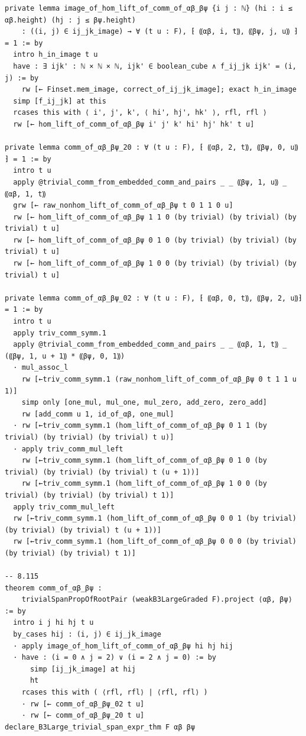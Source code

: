 \begin{Verbatim}
private lemma image_of_hom_lift_of_comm_of_αβ_βψ {i j : ℕ} (hi : i ≤ αβ.height) (hj : j ≤ βψ.height)
    : ((i, j) ∈ ij_jk_image) → ∀ (t u : F), ⁅ ⸨αβ, i, t⸩, ⸨βψ, j, u⸩ ⁆ = 1 := by
  intro h_in_image t u
  have : ∃ ijk' : ℕ × ℕ × ℕ, ijk' ∈ boolean_cube ∧ f_ij_jk ijk' = (i, j) := by
    rw [← Finset.mem_image, correct_of_ij_jk_image]; exact h_in_image
  simp [f_ij_jk] at this
  rcases this with ⟨ i', j', k', ⟨ hi', hj', hk' ⟩, rfl, rfl ⟩
  rw [← hom_lift_of_comm_of_αβ_βψ i' j' k' hi' hj' hk' t u]

private lemma comm_of_αβ_βψ_20 : ∀ (t u : F), ⁅ ⸨αβ, 2, t⸩, ⸨βψ, 0, u⸩ ⁆ = 1 := by
  intro t u
  apply @trivial_comm_from_embedded_comm_and_pairs _ _ ⸨βψ, 1, u⸩ _ ⸨αβ, 1, t⸩
  grw [← raw_nonhom_lift_of_comm_of_αβ_βψ t 0 1 1 0 u]
  rw [← hom_lift_of_comm_of_αβ_βψ 1 1 0 (by trivial) (by trivial) (by trivial) t u]
  rw [← hom_lift_of_comm_of_αβ_βψ 0 1 0 (by trivial) (by trivial) (by trivial) t u]
  rw [← hom_lift_of_comm_of_αβ_βψ 1 0 0 (by trivial) (by trivial) (by trivial) t u]

private lemma comm_of_αβ_βψ_02 : ∀ (t u : F), ⁅ ⸨αβ, 0, t⸩, ⸨βψ, 2, u⸩⁆ = 1 := by
  intro t u
  apply triv_comm_symm.1
  apply @trivial_comm_from_embedded_comm_and_pairs _ _ ⸨αβ, 1, t⸩ _ (⸨βψ, 1, u + 1⸩ * ⸨βψ, 0, 1⸩)
  · mul_assoc_l
    rw [←triv_comm_symm.1 (raw_nonhom_lift_of_comm_of_αβ_βψ 0 t 1 1 u 1)]
    simp only [one_mul, mul_one, mul_zero, add_zero, zero_add]
    rw [add_comm u 1, id_of_αβ, one_mul]
  · rw [←triv_comm_symm.1 (hom_lift_of_comm_of_αβ_βψ 0 1 1 (by trivial) (by trivial) (by trivial) t u)]
  · apply triv_comm_mul_left
    rw [←triv_comm_symm.1 (hom_lift_of_comm_of_αβ_βψ 0 1 0 (by trivial) (by trivial) (by trivial) t (u + 1))]
    rw [←triv_comm_symm.1 (hom_lift_of_comm_of_αβ_βψ 1 0 0 (by trivial) (by trivial) (by trivial) t 1)]
  apply triv_comm_mul_left
  rw [←triv_comm_symm.1 (hom_lift_of_comm_of_αβ_βψ 0 0 1 (by trivial) (by trivial) (by trivial) t (u + 1))]
  rw [←triv_comm_symm.1 (hom_lift_of_comm_of_αβ_βψ 0 0 0 (by trivial) (by trivial) (by trivial) t 1)]

-- 8.115
theorem comm_of_αβ_βψ :
    trivialSpanPropOfRootPair (weakB3LargeGraded F).project ⟨αβ, βψ⟩ := by
  intro i j hi hj t u
  by_cases hij : (i, j) ∈ ij_jk_image
  · apply image_of_hom_lift_of_comm_of_αβ_βψ hi hj hij
  · have : (i = 0 ∧ j = 2) ∨ (i = 2 ∧ j = 0) := by
      simp [ij_jk_image] at hij
      ht
    rcases this with ( ⟨rfl, rfl⟩ | ⟨rfl, rfl⟩ )
    · rw [← comm_of_αβ_βψ_02 t u]
    · rw [← comm_of_αβ_βψ_20 t u]
declare_B3Large_trivial_span_expr_thm F αβ βψ


\end{Verbatim}

